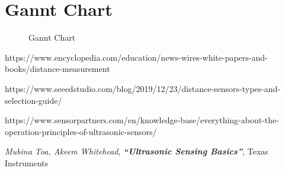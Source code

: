 \documentclass[12pt, a4paper]{article}
\begin{document}
    \pagebreak
    \section{Gannt Chart}

        \begin{figure}[H]\centering
                \caption{Gannt Chart}
        \end{figure}



    


    \begin{thebibliography}{}	
        https://www.encyclopedia.com/education/news-wires-white-papers-and-books/distance-measurement

        https://www.seeedstudio.com/blog/2019/12/23/distance-sensors-types-and-selection-guide/

        https://www.sensorpartners.com/en/knowledge-base/everything-about-the-operation-principles-of-ultrasonic-sensors/ 
        
        \bibitem{}
        \textit{Mubina Toa, Akeem Whitehead}, \textbf{\textit{``Ultrasonic Sensing Basics''}}, Texas Instruments
    \end{thebibliography}
            
\end{document}
